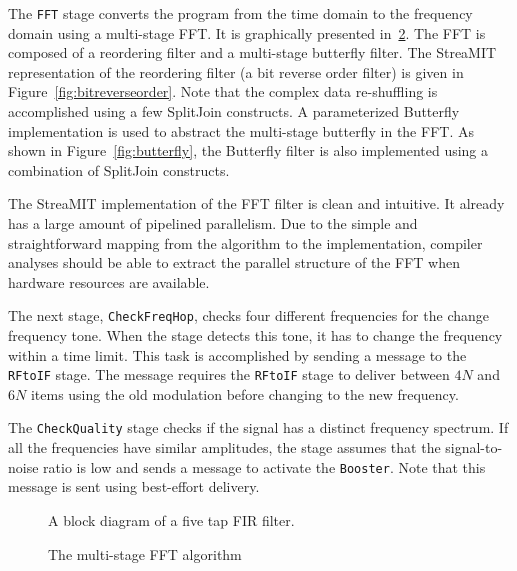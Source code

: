 The {\tt FFT} stage converts the program from the time domain to the
frequency domain using a multi-stage FFT. It is graphically presented
in~\ref{fig:fftfilter}. The FFT is composed of a reordering filter and
a multi-stage butterfly filter. The StreaMIT representation of the
reordering filter (a bit reverse order filter) is given in
Figure~\ref{fig:bitreverseorder}. Note that the complex data
re-shuffling is accomplished using a few SplitJoin constructs.  A
parameterized Butterfly implementation is used to abstract the
multi-stage butterfly in the FFT. As shown in
Figure~\ref{fig:butterfly}, the Butterfly filter is also implemented
using a combination of SplitJoin constructs.

The StreaMIT implementation of the FFT filter is clean and
intuitive. It already has a large amount of pipelined parallelism. Due
to the simple and straightforward mapping from the algorithm to the
implementation, compiler analyses should be able to extract the
parallel structure of the FFT when hardware resources are available.

The next stage, {\tt CheckFreqHop}, checks four different frequencies
for the change frequency tone. When the stage detects this tone, it
has to change the frequency within a time limit. This task is
accomplished by sending a message to the {\tt RFtoIF} stage.  The
message requires the {\tt RFtoIF} stage to deliver between $4N$ and
$6N$ items using the old modulation before changing to the new
frequency.

The {\tt CheckQuality} stage checks if the signal has a distinct
frequency spectrum. If all the frequencies have similar amplitudes,
the stage assumes that the signal-to-noise ratio is low and sends a
message to activate the {\tt Booster}. Note that this message is sent
using best-effort delivery.

\begin{figure}[t]
\centering
{}
\caption{A block diagram of a five tap FIR filter.}
\label{fig:firfilter}
\end{figure}

\begin{figure}[t]
\centering
{}
\caption{The multi-stage FFT algorithm}
\label{fig:fftfilter}
\end{figure}